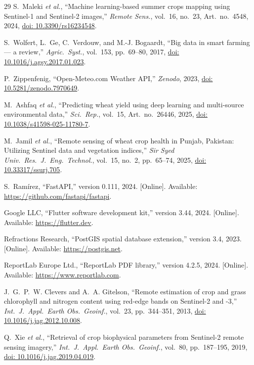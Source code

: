 \documentclass[conference]{IEEEtran}
\begin{document}
\begin{thebibliography}{29}
S.~Maleki \textit{et al.},
``Machine learning-based summer crops mapping using Sentinel-1 and
Sentinel-2 images,''
\textit{Remote Sens.}, vol.~16, no.~23, Art.\ no.~4548, 2024,
\href{https://doi.org/10.3390/rs16234548}{doi: 10.3390/rs16234548}.

S.~Wolfert, L.~Ge, C.~Verdouw, and M.-J. Bogaardt,
``Big data in smart farming --- a review,''
\textit{Agric.\ Syst.}, vol.~153, pp.~69--80, 2017,
\href{https://doi.org/10.1016/j.agsy.2017.01.023}{doi: 10.1016/j.agsy.2017.01.023}.

P.~Zippenfenig,
``Open-Meteo.com Weather API,''
\textit{Zenodo}, 2023,
\href{https://doi.org/10.5281/zenodo.7970649}{doi: 10.5281/zenodo.7970649}.

M.~Ashfaq \textit{et al.},
``Predicting wheat yield using deep learning and multi-source environmental
data,''
\textit{Sci.\ Rep.}, vol.~15, Art.\ no.~26446, 2025,
\href{https://doi.org/10.1038/s41598-025-11780-7}{doi: 10.1038/s41598-025-11780-7}.

M.~Jamil \textit{et al.},
``Remote sensing of wheat crop health in Punjab, Pakistan: Utilizing
Sentinel data and vegetation indices,''
\textit{Sir Syed Univ.\ Res.\ J.\ Eng.\ Technol.}, vol.~15, no.~2,
pp.~65--74, 2025,
\href{https://doi.org/10.33317/ssurj.705}{doi: 10.33317/ssurj.705}.

S.~Ram\'irez,
``FastAPI,'' version 0.111, 2024. [Online].
Available: \url{https://github.com/fastapi/fastapi}.

Google LLC,
``Flutter software development kit,'' version 3.44, 2024. [Online].
Available: \url{https://flutter.dev}.

Refractions Research,
``PostGIS spatial database extension,'' version 3.4, 2023. [Online].
Available: \url{https://postgis.net}.

ReportLab Europe Ltd.,
``ReportLab PDF library,'' version 4.2.5, 2024. [Online].
Available: \url{https://www.reportlab.com}.

J.~G.~P.~W. Clevers and A.~A. Gitelson,
``Remote estimation of crop and grass chlorophyll and nitrogen content
using red-edge bands on Sentinel-2 and -3,''
\textit{Int.\ J.\ Appl.\ Earth Obs.\ Geoinf.}, vol.~23, pp.~344--351,
2013,
\href{https://doi.org/10.1016/j.jag.2012.10.008}{doi: 10.1016/j.jag.2012.10.008}.

Q.~Xie \textit{et al.},
``Retrieval of crop biophysical parameters from Sentinel-2 remote sensing
imagery,''
\textit{Int.\ J.\ Appl.\ Earth Obs.\ Geoinf.}, vol.~80, pp.~187--195,
2019,
\href{https://doi.org/10.1016/j.jag.2019.04.019}{doi: 10.1016/j.jag.2019.04.019}.


\end{thebibliography}
\end{document}
